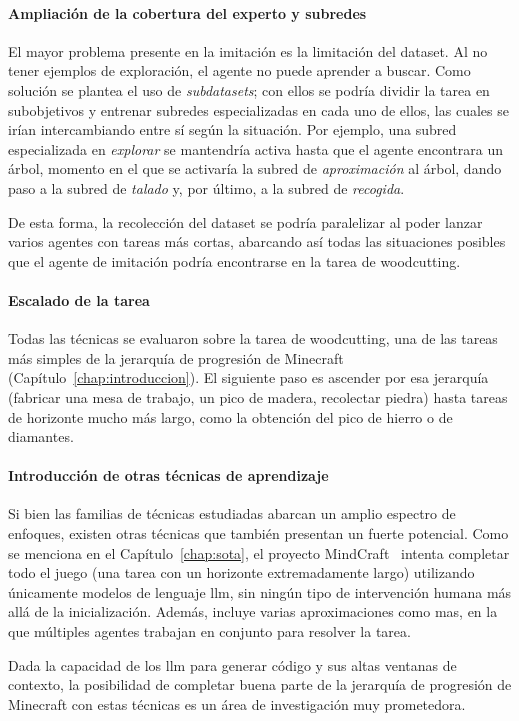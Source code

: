 \paragraph{Ampliación de la cobertura del experto y subredes}
\label{sec:tf-cobertura}
El mayor problema presente en la imitación es la limitación del \gls{dataset}. Al no tener ejemplos de
exploración, el agente no puede aprender a buscar. Como solución se plantea el uso de \textit{subdatasets};
con ellos se podría dividir la tarea en subobjetivos y entrenar subredes especializadas en cada uno de ellos,
las cuales se irían intercambiando entre sí según la situación. Por ejemplo, una subred especializada en \emph{explorar}
se mantendría activa hasta que el agente encontrara un árbol, 
momento en el que se activaría la subred de \emph{aproximación} al árbol, dando paso a la subred de \emph{talado} y, por
último, a la subred de \emph{recogida}.

De esta forma, la recolección del \gls{dataset} se podría paralelizar al poder lanzar varios agentes con tareas más cortas,
abarcando así todas las situaciones posibles que el agente de imitación 
podría encontrarse en la tarea de \gls{woodcutting}.

\paragraph{Escalado de la tarea}
\label{sec:tf-escalado}
Todas las técnicas se evaluaron sobre la tarea de \gls{woodcutting}, una de las tareas
más simples de la jerarquía de progresión de Minecraft (Capítulo~\ref{chap:introduccion}). El siguiente
paso es ascender por esa jerarquía (fabricar una mesa de trabajo, un pico de
madera, recolectar piedra) hasta tareas de horizonte mucho más largo,
como la obtención del pico de hierro o de diamantes. 

\paragraph{Introducción de otras técnicas de aprendizaje}
\label{sec:tf-otras-tecnicas}
Si bien las familias de técnicas estudiadas abarcan un amplio espectro de enfoques, 
existen otras técnicas que también presentan un fuerte potencial. Como se menciona en el Capítulo~\ref{chap:sota}, el proyecto
MindCraft~\cite{mindcraft2025} intenta completar todo el juego (una tarea con un horizonte extremadamente
largo) utilizando únicamente modelos de lenguaje \gls{llm}, sin ningún tipo de intervención humana más
allá de la inicialización. Además, incluye varias aproximaciones como \gls{mas}, en la que múltiples agentes
trabajan en conjunto para resolver la tarea.

Dada la capacidad de los \gls{llm} para generar código y sus altas ventanas de contexto, la posibilidad
de completar buena parte de la jerarquía de progresión de Minecraft con estas técnicas es 
un área de investigación muy prometedora.